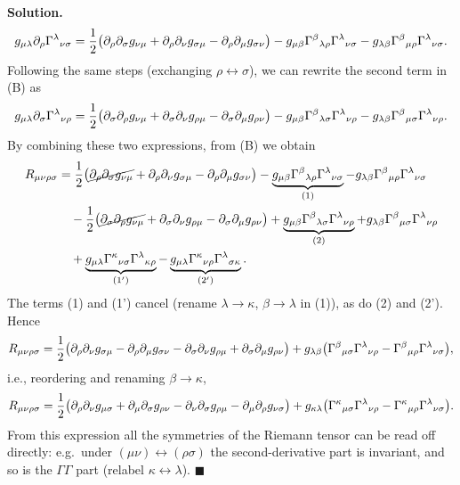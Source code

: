 \documentclass[11pt,a4paper]{article}
\numberwithin{equation}{subsection}
\newenvironment{solution}{\par\noindent\textbf{\textcolor{excol!70!black}{Solution.}}\ }{\hfill$\blacksquare$\par\medskip}
\newcommand{\added}[1]{{\color{teal!60!black}#1}}
\begin{document}
\begin{solution}
\[
  g_{\mu\lambda}\partial_\rho\Gamma^\lambda{}_{\nu\sigma}=\frac12\big(\partial_\rho\partial_\sigma g_{\nu\mu}+\partial_\rho\partial_\nu g_{\sigma\mu}-\partial_\rho\partial_\mu g_{\sigma\nu}\big)-g_{\mu\beta}\Gamma^\beta{}_{\lambda\rho}\Gamma^\lambda{}_{\nu\sigma}-g_{\lambda\beta}\Gamma^\beta{}_{\mu\rho}\Gamma^\lambda{}_{\nu\sigma}.
\]
Following the same steps (exchanging $\rho\leftrightarrow\sigma$), we can rewrite the second term in (B) as
\[
  g_{\mu\lambda}\partial_\sigma\Gamma^\lambda{}_{\nu\rho}=\frac12\big(\partial_\sigma\partial_\rho g_{\nu\mu}+\partial_\sigma\partial_\nu g_{\rho\mu}-\partial_\sigma\partial_\mu g_{\rho\nu}\big)-g_{\mu\beta}\Gamma^\beta{}_{\lambda\sigma}\Gamma^\lambda{}_{\nu\rho}-g_{\lambda\beta}\Gamma^\beta{}_{\mu\sigma}\Gamma^\lambda{}_{\nu\rho}.
\]
By combining these two expressions, from (B) we obtain
\begin{align*}
  R_{\mu\nu\rho\sigma}&=\frac12\big(\cancel{\partial_\rho\partial_\sigma g_{\nu\mu}}+\partial_\rho\partial_\nu g_{\sigma\mu}-\partial_\rho\partial_\mu g_{\sigma\nu}\big)-\underbrace{g_{\mu\beta}\Gamma^\beta{}_{\lambda\rho}\Gamma^\lambda{}_{\nu\sigma}}_{\rm(1)}-g_{\lambda\beta}\Gamma^\beta{}_{\mu\rho}\Gamma^\lambda{}_{\nu\sigma}\\
  &\quad-\frac12\big(\cancel{\partial_\sigma\partial_\rho g_{\nu\mu}}+\partial_\sigma\partial_\nu g_{\rho\mu}-\partial_\sigma\partial_\mu g_{\rho\nu}\big)+\underbrace{g_{\mu\beta}\Gamma^\beta{}_{\lambda\sigma}\Gamma^\lambda{}_{\nu\rho}}_{\rm(2)}+g_{\lambda\beta}\Gamma^\beta{}_{\mu\sigma}\Gamma^\lambda{}_{\nu\rho}\\
  &\quad+\underbrace{g_{\mu\lambda}\Gamma^\kappa{}_{\nu\sigma}\Gamma^\lambda{}_{\kappa\rho}}_{\rm(1')}-\underbrace{g_{\mu\lambda}\Gamma^\kappa{}_{\nu\rho}\Gamma^\lambda{}_{\sigma\kappa}}_{\rm(2')} .
\end{align*}
The terms (1) and (1') cancel (rename $\lambda\to\kappa$, $\beta\to\lambda$ in (1)), as do (2) and (2'). Hence
\[
  R_{\mu\nu\rho\sigma}=\frac12\big(\partial_\rho\partial_\nu g_{\sigma\mu}-\partial_\rho\partial_\mu g_{\sigma\nu}-\partial_\sigma\partial_\nu g_{\rho\mu}+\partial_\sigma\partial_\mu g_{\rho\nu}\big)+g_{\lambda\beta}\big(\Gamma^\beta{}_{\mu\sigma}\Gamma^\lambda{}_{\nu\rho}-\Gamma^\beta{}_{\mu\rho}\Gamma^\lambda{}_{\nu\sigma}\big),
\]
i.e., reordering and renaming $\beta\to\kappa$,
\[
  R_{\mu\nu\rho\sigma}=\frac12\big(\partial_\rho\partial_\nu g_{\mu\sigma}+\partial_\mu\partial_\sigma g_{\rho\nu}-\partial_\nu\partial_\sigma g_{\rho\mu}-\partial_\mu\partial_\rho g_{\nu\sigma}\big)+g_{\kappa\lambda}\big(\Gamma^\kappa{}_{\mu\sigma}\Gamma^\lambda{}_{\nu\rho}-\Gamma^\kappa{}_{\mu\rho}\Gamma^\lambda{}_{\nu\sigma}\big).
\]
\added{From this expression all the symmetries of the Riemann tensor can be read off directly: e.g.\ under $(\mu\nu)\leftrightarrow(\rho\sigma)$ the second-derivative part is invariant, and so is the $\Gamma\Gamma$ part (relabel $\kappa\leftrightarrow\lambda$).}
\end{solution}
\end{document}
